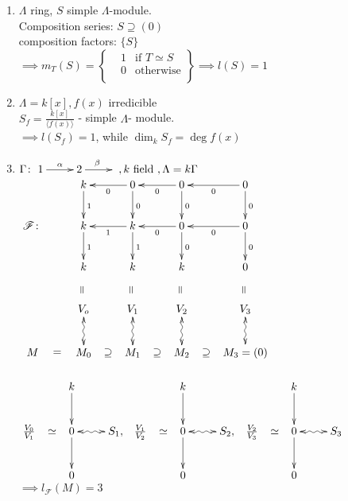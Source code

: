 \begin{exam}
	\begin{enumerate}[(1)]
		\item $\Lambda$ ring, $S$ simple $\Lambda$-module.\\
		Composition series: $S \supseteq (0)$\\
		composition factors: $\{S\}$\\
		$\implies m_T(S) = \left\{\!\begin{aligned}
			&1 &\text{if } T \simeq S\\[1ex]
			&0 &\text{otherwise}\\[1ex]
		\end{aligned}\right\}\implies l(S)=1$
		\item $\Lambda = k[x], f(x)$ irredicible\\
		$S_f=\frac{k[x]}{\langle f(x) \rangle}$ - simple $\Lambda$- module.\\
		$\implies l(S_f)=1$, while $\dim_kS_f = \deg f(x)$ \\
		\item $\G\colon  \xymatrix{1\ar[r]^\alpha & 2\ar[r]^\beta & }, k \text{ field } , \Lambda=k\G$\\
		$
		\xymatrix
		{
			& k\ar[d]^1 & 0 \ar[l]^0\ar[d]^0  & 0\ar[l]^0\ar[d]^0 & 0\ar[l]^0\ar[d]^0 \\
		\mathscr{F}\colon	&k \ar[d]^1  & k\ar[l]^1\ar[d]^1 & 0\ar[l]^0\ar[d]^0 & 0\ar[l]^0\ar[d]^0 \\
			&k \ar@{}[d]|-*[@]{=}& k\ar@{}[d]|-*[@]{=} & k\ar@{}[d]|-*[@]{=} & 0\ar@{}[d]|-*[@]{=} \\\
			&V_o\ar@{<~>}[d] & V_1\ar@{<~>}[d] & V_2\ar@{<~>}[d] & V_3\ar@{<~>}[d]\\
			M \ar@{}[r]|-*[@]{=} & M_0 \ar@{}[r]|-*[@]{\supseteq}  &  M_1 \ar@{}[r]|-*[@]{\supseteq} & M_2 \ar@{}[r]|-*[@]{\supseteq} & M_3 = (0) \\
		}$\\~\\
	
	$\xymatrix
	{
		& k\ar[d] & \\
		\frac{V_0}{V_1} \ar@{}[r]|-*[@]{\simeq}	& 0\ar[d]\ar@{<~>}[r] & S_1 , \\
		& 0 & \\
	}$
$\xymatrix
{
	& k\ar[d] & \\
	\frac{V_1}{V_2} \ar@{}[r]|-*[@]{\simeq}	& 0\ar[d]\ar@{<~>}[r] & S_2 , \\
	& 0 & \\
}$
$\xymatrix
{
	& k\ar[d] & \\
	\frac{V_2}{V_3} \ar@{}[r]|-*[@]{\simeq}	& 0\ar[d]\ar@{<~>}[r] & S_3 \\
	& 0 & \\
}$\\
$\implies l_{\mathscr{F}}(M)=3$\\~\\


\end{enumerate}
\end{exam}
